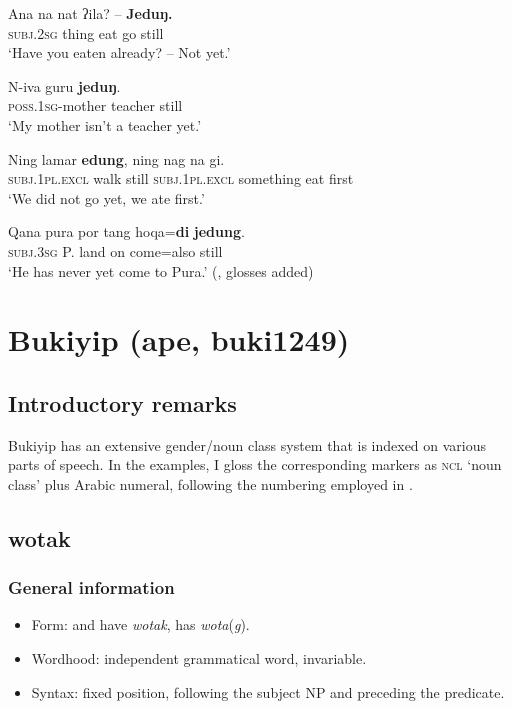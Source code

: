 \begin{exe}
	\ex\label{exAppendixBlagarNotYet1}
	\gll Ana na nat ʔila? – \textbf{Jeduŋ.}\\
	\textsc{subj}.2\textsc{sg} thing eat go {} still\\
	\glt \lq Have you eaten already? -- Not yet.' \parencite[215]{SteinhauerBlagar}
	
	\ex\label{exAppendixBlagarNotYet2}
	\gll N-iva guru \textbf{jeduŋ}.\\ 
	\textsc{poss}.1\textsc{sg}-mother teacher still\\
	\glt \lq My mother isn’t a teacher yet.' \parencite[165]{SteinhauerBlagar}
	
	\ex\label{exAppendixBlagarNotYet3}
	\gll Ning lamar \textbf{edung}, ning nag na gi.\\
	\textsc{subj}.1\textsc{pl}.\textsc{excl} walk still \textsc{subj}.1\textsc{pl}.\textsc{excl} something eat first\\
	\glt \lq We did not go yet, we ate first.\rq{ }\parencite[154]{SteinhauerBukalabang}
	
	\ex\label{exAppendixBlagarNotYet4}
	\gll Qana pura por tang hoqa=\textbf{di} \textbf{jedung}.\\
	\textsc{subj}.3\textsc{sg} P. land on come=also still\\
	\glt \lq He has never yet come to Pura.' (\cite[175]{SteinhauerGomang2016}, glosses added)
\end{exe}

\section{Bukiyip (ape, buki1249)}
\label{appendixBukiyip} 

\subsection{Introductory remarks}
Bukiyip has an extensive gender/noun class system that is indexed on various parts of speech. In the examples, I gloss the corresponding markers as \textsc{ncl} \lq noun class' plus Arabic numeral, following the numbering employed in \textcite{ConradWigoga1991}.
\largerpage[2.25]

\subsection{wotak}
\subsubsection{General information}
\begin{itemize}
	\item Form: \textcite{Conrad1998}  and \textcite{ConradWigoga1991} have \textit{wotak}, \textcite{Gerstner1963} has \mbox{\textit{wota}(\textit{g})}.
	\item Wordhood: independent grammatical word, invariable.
	\item Syntax: fixed position, following the subject NP and preceding the predicate.
\end{itemize}

